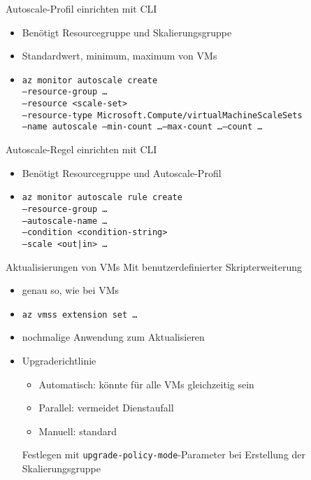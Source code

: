 \begin{flashcard}[Definition]{Autoscale-Profil einrichten mit CLI}
    \begin{itemize}
        \item Benötigt Resourcegruppe und Skalierungsgruppe
        \item Standardwert, minimum, maximum von VMs
        \item \texttt{az monitor autoscale create\\--resource-group \ldots\\--resource <scale-set>\\--resource-type Microsoft.Compute/virtualMachineScaleSets\\--name autoscale --min-count \ldots --max-count \ldots --count \ldots}
    \end{itemize}
\end{flashcard}

\begin{flashcard}[Definition]{Autoscale-Regel einrichten mit CLI}
    \begin{itemize}
        \item Benötigt Resourcegruppe und Autoscale-Profil
        \item \texttt{az monitor autoscale rule create\\--resource-group \ldots\\--autoscale-name \ldots\\--condition <condition-string>\\--scale <out|in> \ldots}
    \end{itemize}
\end{flashcard}

\begin{flashcard}[Definition]{Aktualisierungen von VMs}
    Mit benutzerdefinierter Skripterweiterung
    \begin{itemize}
        \item genau so, wie bei VMs
        \item \texttt{az vmss extension set \ldots}
        \item nochmalige Anwendung zum Aktualisieren
        \item Upgraderichtlinie
            \begin{itemize}
                \item Automatisch: könnte für alle VMs gleichzeitig sein
                \item Parallel: vermeidet Dienstaufall
                \item Manuell: standard
            \end{itemize}
            Festlegen mit \texttt{upgrade-policy-mode}-Parameter bei Erstellung der Skalierungsgruppe
    \end{itemize}
\end{flashcard}
   
